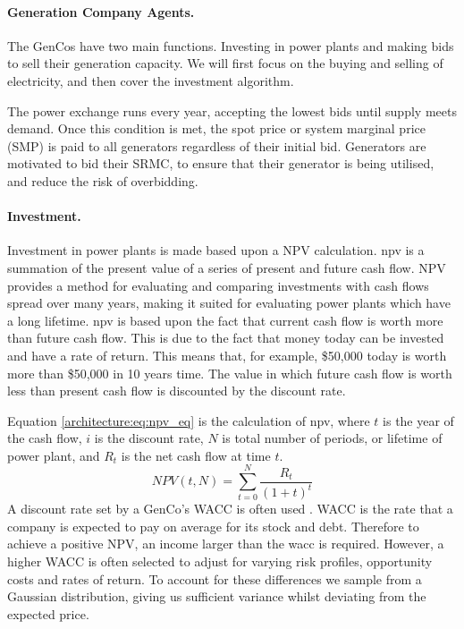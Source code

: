 

\paragraph{Generation Company Agents.} The GenCos have two main functions. Investing in power plants and making bids to sell their generation capacity. We will first focus on the buying and selling of electricity, and then cover the investment algorithm.

The power exchange runs every year, accepting the lowest bids until supply meets demand. Once this condition is met, the spot price or system marginal price (SMP) is paid to all generators regardless of their initial bid. Generators are motivated to bid their \acrshort{SRMC}, to ensure that their generator is being utilised, and reduce the risk of overbidding.

\paragraph{Investment.} Investment in power plants is made based upon a \Gls{NPV} calculation. \acrshort{npv} is a summation of the present value of a series of present and future cash flow. NPV provides a method for evaluating and comparing investments with cash flows spread over many years, making it suited for evaluating power plants which have a long lifetime.  \acrshort{npv} is based upon the fact that current cash flow is worth more than future cash flow. This is due to the fact that money today can be invested and have a rate of return. This means that, for example, \$50,000 today is worth more than \$50,000 in 10 years time. The value in which future cash flow is worth less than present cash flow is discounted by the discount rate.

Equation \ref{architecture:eq:npv_eq} is the calculation of \acrshort{npv}, where $t$ is the year of the cash flow, $i$ is the discount rate, $N$ is total number of periods, or lifetime of power plant, and $R_t$ is the net cash flow at time $t$.
\begin{equation} \label{architecture:eq:npv_eq}
NPV(t, N) = \sum_{t=0}^{N}\frac{R_t}{(1+t)^t}
\end{equation}
A discount rate set by a GenCo's \gls{WACC} is often used \cite{KincheloeStephenC1990TWAC}. WACC is the rate that a company is expected to pay on average for its stock and debt. Therefore to achieve a positive NPV, an income larger than the \acrshort{wacc} is required. However, a higher WACC is often selected to adjust for varying risk profiles, opportunity costs and rates of return. To account for these differences we sample from a Gaussian distribution, giving us sufficient variance whilst deviating from the expected price.


